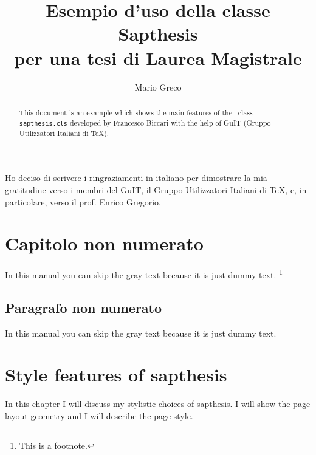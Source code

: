 \documentclass[LaM,binding=0.6cm]{sapthesis}
\title{Esempio d'uso della classe Sapthesis\\ per una tesi di Laurea Magistrale}
\author{Mario Greco}
\begin{document}
\frontmatter

\maketitle

\dedication{Dedicato a\\ Donald Knuth}

\begin{abstract}
This document is an example which shows the main features of
the \LaTeXe\ class \texttt{sapthesis.cls} developed by Francesco Biccari
with the help of GuIT (Gruppo Utilizzatori Italiani di \TeX).
\end{abstract}

\begin{acknowledgments}
Ho deciso di scrivere i ringraziamenti in italiano
per dimostrare la mia gratitudine verso i membri
del GuIT, il Gruppo Utilizzatori Italiani di \TeX, e, in particolare,
verso il prof. Enrico Gregorio.
\end{acknowledgments}

\tableofcontents

\chapter{Capitolo non numerato}

In this manual you can skip the gray text because it is just dummy text.%
\footnote{This is a footnote.}

\textcolor{gray}{\lipsum[1-22]}


\section*{Paragrafo non numerato}

In this manual you can skip the gray text because it is just dummy text.

\textcolor{gray}{\lipsum[1-22]}




\mainmatter

\chapter{Style features of \textsf{sapthesis}}

In this chapter I will discuss my stylistic choices of \textsf{sapthesis}.
I will show the page layout geometry and I will describe the page style.
\end{document}
